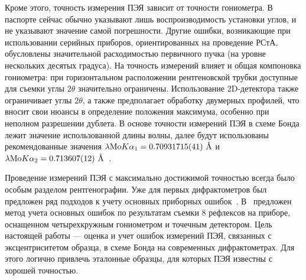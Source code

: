 Кроме этого, точность измерения ПЭЯ зависит от точности гониометра.
В паспорте сейчас обычно указывают лишь воспроизводимость установки углов, и не указывают значение самой погрешности.
Другие ошибки, возникающие при использовании серийных приборов, ориентированных на проведение РСтА, обусловлены значительной расходимостью первичного пучка (на уровне нескольких десятых градуса).
На точность измерений влияет и общая компоновка гониометра: при горизонтальном расположении рентгеновской трубки доступные для съемки углы $2\theta$ значительно ограничены.
Использование 2D-детектора также ограничивает углы $2\theta$, а также предполагает обработку двумерных профилей, что вносит свои нюансы в определение положения максимума, особенно при неполном разрешении дублета.
В основе точности измерений ПЭЯ в схеме Бонда лежит значение использованной длины волны, далее будут использованы рекомендованные значения $\lambda \text{Mo} K \alpha_1 = 0.70931715 (41)\ \text{\AA}$ и $\lambda \text{Mo} K \alpha_2 = 0.713607 (12)\ \text{\AA}$~\cite{Deslattes:1985}.

Проведение измерений ПЭЯ с максимально достижимой точностью всегда было особым разделом рентгенографии.
Уже для первых дифрактометров был предложен ряд подходов к учету основных приборных ошибок~\cite{Ponomarev:1969}. В~\cite{King:1979} предложен метод учета основных ошибок по результатам съемки 8 рефлексов на приборе, оснащенном четырехкружным гониометром и точечным детектором.
Цель настоящей работы --- оценка и учет ошибок измерений ПЭЯ, связанных с эксцентриситетом образца, в схеме Бонда на современных дифрактометрах.
Для этого логично привлечь эталонные образцы, для которых ПЭЯ известны с хорошей точностью.
